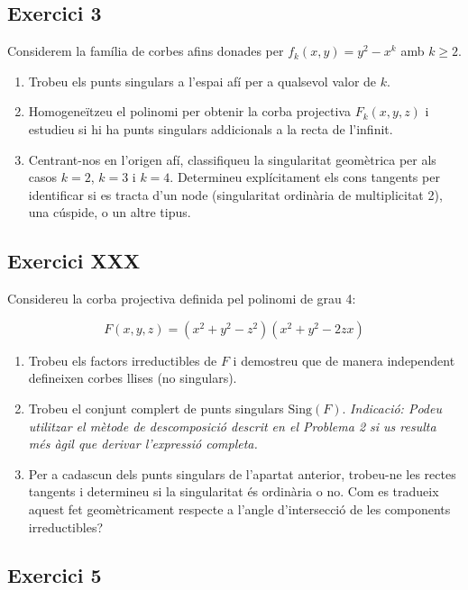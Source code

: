 \documentclass[11pt, a4paper]{article}
\begin{document}
\subsection{Exercici 3}
\newpage
\begin{tcolorbox}[title=\section{Exercici 4}]
Considerem la família de corbes afins donades per $f_k(x,y)=y^2-x^k$ amb $k\geq2$.
\begin{enumerate}
    \item Trobeu els punts singulars a l'espai afí per a qualsevol valor de $k$.
    
    \item Homogeneïtzeu el polinomi per obtenir la corba projectiva $F_k(x,y,z)$ i estudieu si hi ha punts singulars addicionals a la recta de l'infinit.
    
    \item Centrant-nos en l'origen afí, classifiqueu la singularitat geomètrica per als casos $k=2$, $k=3$ i $k=4$. Determineu explícitament els cons tangents per identificar si es tracta d'un node (singularitat ordinària de multiplicitat 2), una cúspide, o un altre tipus.
\end{enumerate}

\end{tcolorbox}
\subsection{Exercici XXX}

\newpage
\begin{tcolorbox}[title=\section{Exercici XXX}]
Considereu la corba projectiva definida pel polinomi de grau 4:

\[
F(x,y,z)=(x^2 +y^2-z^2)(x ^2+y ^2-2zx)
\]
\begin{enumerate}
    \item Trobeu els factors irreductibles de $F$ i demostreu que de manera independent defineixen corbes llises (no singulars).
    
    \item Trobeu el conjunt complert de punts singulars $\mathrm{Sing}(F)$. \textit{Indicació: Podeu utilitzar el mètode de descomposició descrit en el Problema 2 si us resulta més àgil que derivar l'expressió completa.}
    
    \item Per a cadascun dels punts singulars de l'apartat anterior, trobeu-ne les rectes tangents i determineu si la singularitat és ordinària o no. Com es tradueix aquest fet geomètricament respecte a l'angle d'intersecció de les components irreductibles?
\end{enumerate}
\end{tcolorbox}
\subsection{Exercici 5}
\end{document}
